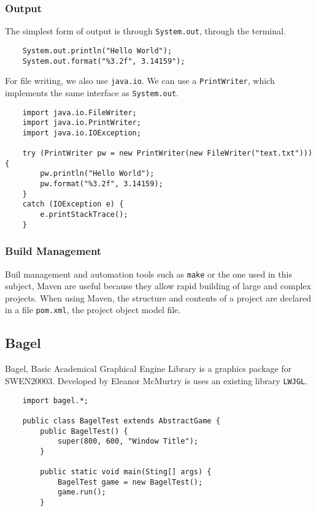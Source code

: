 \documentclass[12pt]{report}
\newcommand{\code}[1]{\lstinline{#1}}
\begin{document}
\begin{flushleft}
\subsubsection*{Output}

The simplest form of output is through \code{System.out}, through the terminal.

\begin{lstlisting}
    System.out.println("Hello World");
    System.out.format("%3.2f", 3.14159");
\end{lstlisting}

For file writing, we also use \code{java.io}. We can use a \code{PrintWriter},
which implements the same interface as \code{System.out}.

\begin{lstlisting}
    import java.io.FileWriter;
    import java.io.PrintWriter;
    import java.io.IOException;

    try (PrintWriter pw = new PrintWriter(new FileWriter("text.txt"))) {
        pw.println("Hello World");
        pw.format("%3.2f", 3.14159);
    }
    catch (IOException e) {
        e.printStackTrace();
    }
\end{lstlisting}

\subsubsection*{Build Management}

Buil management and automation tools such as \code{make} or the one used in
this subject, Maven are useful because they allow rapid building of large and
complex projects. When using Maven, the structure and contents of a project are
declared in a file \code{pom.xml}, the project object model file. 

\subsection*{Bagel}

Bagel, Basic Academical Graphical Engine Library is a graphics package for
SWEN20003. Developed by Eleanor McMurtry is uses an existing library
\code{LWJGL}.

\begin{lstlisting}
    import bagel.*;

    public class BagelTest extends AbstractGame {
        public BagelTest() {
            super(800, 600, "Window Title");
        }

        public static void main(Sting[] args) {
            BagelTest game = new BagelTest();
            game.run();    
        }


\end{lstlisting}
\end{flushleft}
\end{document}
